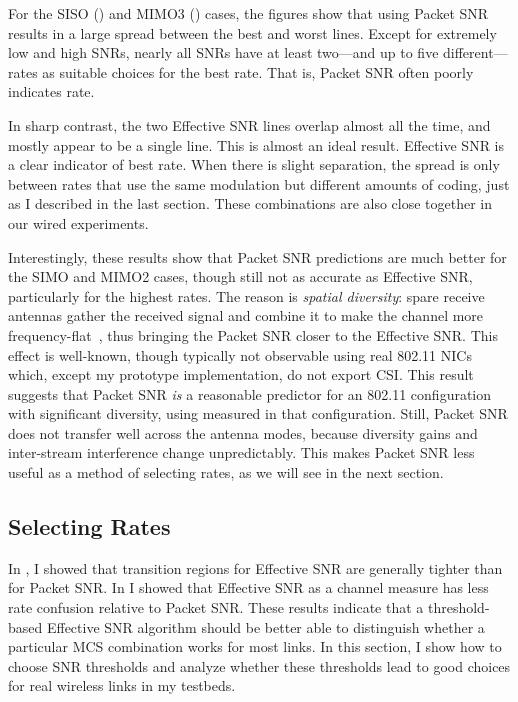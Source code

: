 For the SISO () and MIMO3 () cases, the figures show that using Packet SNR results in a large spread between the best and worst lines. Except for extremely low and high SNRs, nearly all SNRs have at least two---and up to five different---rates as suitable choices for the best rate. That is, Packet SNR often poorly indicates rate.

In sharp contrast, %
the two Effective SNR lines overlap almost all the time, and mostly appear to be a single line. This is almost an ideal result. Effective SNR is a clear indicator of best rate. When there is slight separation, the spread is only between rates that use the same modulation but different amounts of coding, just as I described in the last section. These combinations are also close together in our wired experiments. 

Interestingly, these results show that Packet SNR predictions are much better for the SIMO and MIMO2 cases, though still not as accurate as Effective SNR, particularly for the highest rates. The reason is \emph{spatial diversity}: spare receive antennas gather the received signal and combine it to make the channel more frequency-flat~\cite{Halperin_dummies}, thus bringing the Packet SNR closer to the Effective SNR. This effect is well-known, though typically not observable using real 802.11 NICs which, except my prototype implementation, do not export CSI. This result suggests that Packet SNR \emph{is} a reasonable predictor for an 802.11 configuration with significant diversity, using measured in that configuration. Still, Packet SNR does not transfer well across the antenna modes, because diversity gains and inter-stream interference change unpredictably. This makes Packet SNR less useful as a method of selecting rates, as we will see in the next section.


\subsection{Selecting Rates}
In , I showed that transition regions for Effective SNR are generally tighter than for Packet SNR. In  I showed that Effective SNR as a channel measure has less rate confusion relative to Packet SNR. These results indicate that a threshold-based Effective SNR algorithm should be better able to distinguish whether a particular MCS combination works for most links. In this section, I show how to choose SNR thresholds and analyze whether these thresholds lead to good choices for real wireless links in my testbeds.

